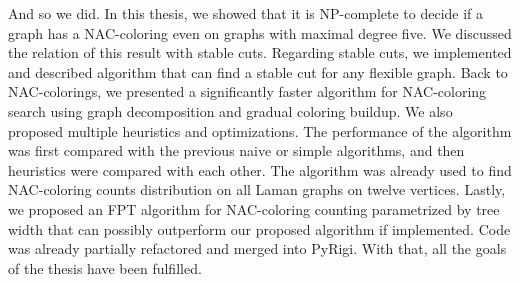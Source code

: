 And so we did.
In this thesis, we showed that it is NP-complete
to decide if a graph has a NAC-coloring even on graphs with maximal degree five.
We discussed the relation of this result with stable cuts.
Regarding stable cuts, we implemented and described algorithm that can find
a stable cut for any flexible graph.
Back to NAC-colorings, we presented a significantly faster algorithm
for NAC-coloring search using graph decomposition and gradual coloring buildup.
We also proposed multiple heuristics and optimizations.
The performance of the algorithm was
first compared with the previous naive or simple
algorithms, and then heuristics were compared with each other.
The algorithm was already used to find NAC-coloring counts distribution
on all Laman graphs on twelve vertices.
Lastly, we proposed an FPT algorithm for NAC-coloring counting
parametrized by tree width that can
possibly outperform our proposed algorithm if implemented.
Code was already partially refactored and merged into PyRigi.
With that, all the goals of the thesis have been fulfilled.

